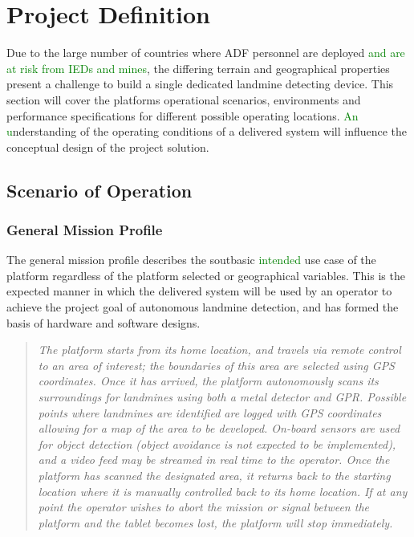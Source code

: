 \documentclass[main.tex]{subfiles}
\begin{document}
\section{Project Definition}
Due to the large number of countries where ADF personnel are deployed \textcolor{green}{and are at risk from IEDs and mines}, the differing terrain and geographical properties present a challenge to build a single dedicated landmine detecting device. This section will cover the platforms operational scenarios, environments and performance specifications for different possible operating locations. \textcolor{green}{An u}nderstanding of the operating conditions of a delivered system will influence the conceptual design of the project solution.
\subsection{Scenario of Operation}

\subsubsection{General Mission Profile}
The general mission profile describes the sout{basic} \textcolor{green}{intended} use case of the platform regardless of the platform selected or geographical variables. This is the expected manner in which the delivered system will be used by an operator to achieve the project goal of autonomous landmine detection, and has formed the basis of hardware and software designs.
\begin{quote}\textit{The platform starts from its home location, and travels via remote control to an area of interest; the boundaries of this area are selected using GPS coordinates. Once it has arrived, the platform autonomously scans its surroundings for landmines using both a metal detector and GPR. Possible points where landmines are identified are logged with GPS coordinates allowing for a map of the area to be developed. On-board sensors are used for object detection (object avoidance is not expected to be implemented), and a video feed may be streamed in real time to the operator. Once the platform has scanned the designated area, it returns back to the starting location where it is manually controlled back to its home location. If at any point the operator wishes to abort the mission or signal between the platform and the tablet becomes lost, the platform will stop immediately.}
\end{quote}
\end{document}
